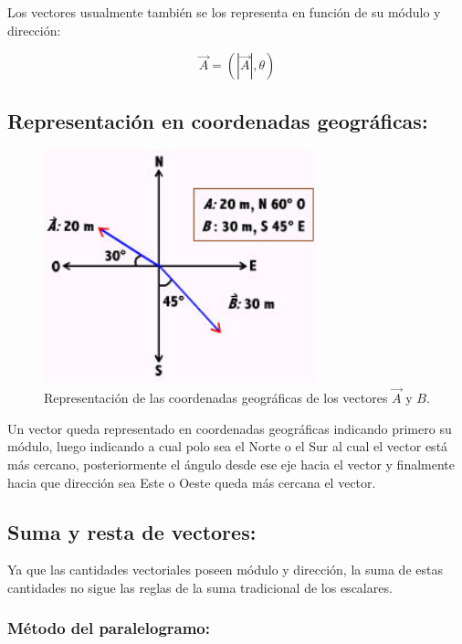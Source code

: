 Los vectores usualmente también se los representa en función de su módulo y dirección:

\begin{equation}
 \vec{A} = (|\vec{A}|, \theta)
\end{equation}

\subsection{Representación en coordenadas geográficas:}

\begin{figure}
 \centering
 \includegraphics[width=0.7\textwidth]{images/vector2.jpg}
   \caption{\small{Representación de las coordenadas geográficas de los vectores $\vec{A}$ y $B$.}}
\end{figure}

Un vector queda representado en coordenadas geográficas indicando primero su módulo, luego indicando a cual polo sea el 
Norte o el Sur al cual el vector está más cercano, posteriormente el ángulo desde ese eje hacia el vector y finalmente 
hacia que dirección sea Este o Oeste queda más cercana el vector.

\subsection{Suma y resta de vectores:}

Ya que las cantidades vectoriales poseen módulo y dirección, la suma de estas cantidades no sigue las reglas de la suma 
tradicional de los escalares.

\subsubsection{Método del paralelogramo:}

